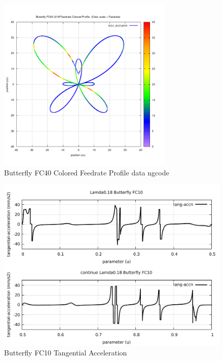\begin{figure}
	\caption     {Butterfly FC40 Colored Feedrate Profile data ngcode}
	\label{20-img-Butterfly-FC40-Colored-Feedrate-Profile-data_ngcode.png}
	\includegraphics[width=0.75\textwidth]{Chap4/appendix/app-Butterfly/plots/20-img-Butterfly-FC40-Colored-Feedrate-Profile-data_ngcode.png}
\end{figure}

\clearpage
\pagebreak

\begin{figure}
	\caption     {Butterfly FC10 Tangential Acceleration}
	\label{21-img-Butterfly-FC10-Tangential-Acceleration.pdf}
	\includegraphics[width=1.00\textwidth]{Chap4/appendix/app-Butterfly/plots/21-img-Butterfly-FC10-Tangential-Acceleration.pdf}
\end{figure}


